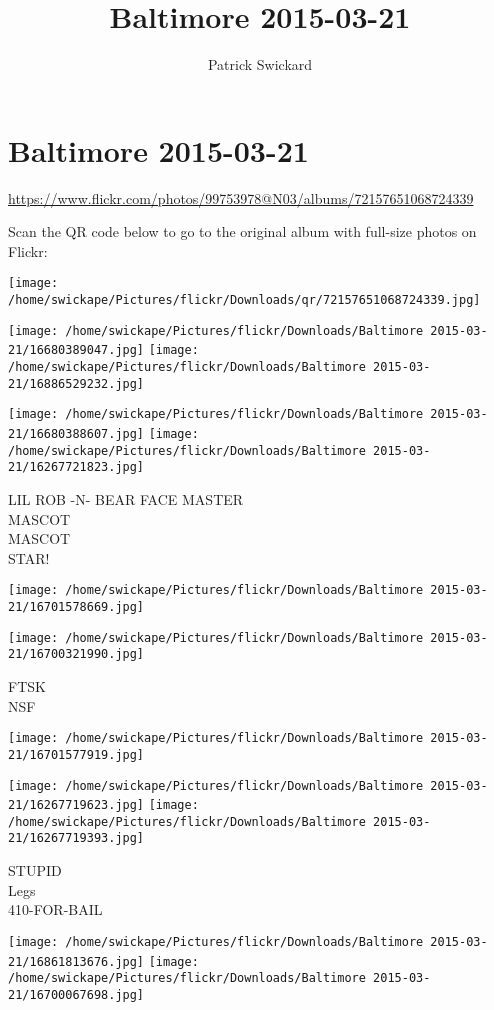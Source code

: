 \documentclass[10pt,letterpaper]{article}
\title{Baltimore 2015-03-21}
\author{Patrick Swickard}
\date{}
\begin{document}
\section*{Baltimore 2015-03-21}

\url{https://www.flickr.com/photos/99753978@N03/albums/72157651068724339}

Scan the QR code below to go to the original album with full-size photos on Flickr:

\texttt{[image: /home/swickape/Pictures/flickr/Downloads/qr/72157651068724339.jpg]}
\pagebreak

\texttt{[image: /home/swickape/Pictures/flickr/Downloads/Baltimore 2015-03-21/16680389047.jpg]}
\texttt{[image: /home/swickape/Pictures/flickr/Downloads/Baltimore 2015-03-21/16886529232.jpg]}

\texttt{[image: /home/swickape/Pictures/flickr/Downloads/Baltimore 2015-03-21/16680388607.jpg]}
\texttt{[image: /home/swickape/Pictures/flickr/Downloads/Baltimore 2015-03-21/16267721823.jpg]}

LIL ROB {-}N{-} BEAR FACE MASTER\\
MASCOT\\
MASCOT\\
STAR!
\pagebreak

\texttt{[image: /home/swickape/Pictures/flickr/Downloads/Baltimore 2015-03-21/16701578669.jpg]}

\vspace{0.25in}
\texttt{[image: /home/swickape/Pictures/flickr/Downloads/Baltimore 2015-03-21/16700321990.jpg]}

FTSK\\
NSF
\pagebreak

\texttt{[image: /home/swickape/Pictures/flickr/Downloads/Baltimore 2015-03-21/16701577919.jpg]}

\vspace{0.25in}
\texttt{[image: /home/swickape/Pictures/flickr/Downloads/Baltimore 2015-03-21/16267719623.jpg]}
\texttt{[image: /home/swickape/Pictures/flickr/Downloads/Baltimore 2015-03-21/16267719393.jpg]}

STUPID\\
Legs\\
410{-}FOR{-}BAIL
\pagebreak

\texttt{[image: /home/swickape/Pictures/flickr/Downloads/Baltimore 2015-03-21/16861813676.jpg]}
\texttt{[image: /home/swickape/Pictures/flickr/Downloads/Baltimore 2015-03-21/16700067698.jpg]}
\end{document}
